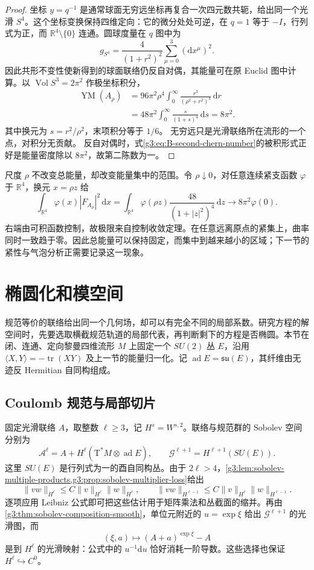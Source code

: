 \begin{proof}
	坐标 \(y=q^{-1}\) 是通常球面无穷远坐标再复合一次四元数共轭，给出同一个光滑 \(S^4\)。这个坐标变换保持四维定向：它的微分处处可逆，在 \(q=1\) 等于 \(-I\)，行列式为正，而 \(\mathbb R^4\setminus\{0\}\) 连通。圆球度量在 \(q\) 图中为
	\[
		g_{S^4}=\frac4{(1+r^2)^2}
		             \sum_{\mu=0}^3(\mathrm dx^\mu)^2.
	\]
	因此共形不变性使新得到的球面联络仍反自对偶，其能量可在原 Euclid 图中计算。以 \(\operatorname{Vol}S^3=2\pi^2\) 作极坐标积分，
	\[
	\begin{aligned}
		\operatorname{YM}(A_\rho)
		&=96\pi^2\rho^4\int_0^\infty
		             \frac{r^3}{(\rho^2+r^2)^4}\,\mathrm dr\\
		&=48\pi^2\int_0^\infty\frac{s}{(1+s)^4}\,\mathrm ds
		=8\pi^2.
	\end{aligned}
	\]
	其中换元为 \(s=r^2/\rho^2\)，末项积分等于 \(1/6\)。
	无穷远只是光滑联络所在流形的一个点，对积分无贡献。
	反自对偶时，式\eqref{g3:eq:B-second-chern-number}的被积形式正好是能量密度除以 \(8\pi^2\)，故第二陈数为一。
\end{proof}

尺度 \(\rho\) 不改变总能量，却改变能量集中的范围。令 \(\rho\downarrow0\)，对任意连续紧支函数 \(\varphi\) 于 \(\mathbb R^4\)，换元 \(x=\rho z\) 给
\[
	\int_{\mathbb R^4}\varphi(x)|F_{A_\rho}|^2\,\mathrm dx
	=\int_{\mathbb R^4}
	      \varphi(\rho z)\frac{48}{(1+|z|^2)^4}\,\mathrm dz
	\longrightarrow8\pi^2\varphi(0).
\]
右端由可积函数控制，故极限来自控制收敛定理。在任意远离原点的紧集上，曲率同时一致趋于零。因此总能量可以保持固定，而集中到越来越小的区域；下一节的紧性与气泡分析正需要记录这一现象。

\section{椭圆化和模空间}
\label{g3:sec:B02}
规范等价的联络给出同一个几何场，却可以有完全不同的局部系数。研究方程的解空间时，先要选取横截规范轨道的局部代表，再判断剩下的方程是否椭圆。本节在闭、连通、定向黎曼四维流形 \(M\) 上固定一个 \(SU(2)\) 丛 \(E\)，沿用 \(\langle X,Y\rangle=-\operatorname{tr}(XY)\) 及上一节的能量归一化。记 \(\operatorname{ad}E=\mathfrak{su}(E)\)，其纤维由无迹反 Hermitian 自同构组成。

\subsection{Coulomb 规范与局部切片}
\label{g3:subsec:B02:01}
固定光滑联络 \(A\)，取整数 \(\ell\ge3\)，记 \(H^s=W^{s,2}\)。联络与规范群的 Sobolev 空间分别为
\[
 \mathcal A^\ell=A+H^\ell(\mathrm T^*M\otimes\operatorname{ad}E),
 \qquad
 \mathcal G^{\ell+1}=H^{\ell+1}(SU(E)).
\]
这里 \(SU(E)\) 是行列式为一的酉自同构丛。由于 \(2\ell>4\)，\cref{g3:lem:sobolev-multiple-products,g3:prop:sobolev-multiplier-loss}给出
\[
 \|vw\|_{H^\ell}\le C\|v\|_{H^\ell}\|w\|_{H^\ell},\qquad
 \|vw\|_{H^{\ell-1}}\le C\|v\|_{H^\ell}\|w\|_{H^{\ell-1}}.
\]
逐项应用 Leibniz 公式即可把这些估计用于矩阵乘法和丛截面的缩并。再由\cref{g3:thm:sobolev-composition-smooth}，单位元附近的 \(u=\exp\xi\) 给出 \(\mathcal G^{\ell+1}\) 的光滑图，而
\[
 (\xi,a)\longmapsto(A+a)^{\exp\xi}-A
\]
是到 \(H^\ell\) 的光滑映射：公式中的 \(u^{-1}\mathrm du\) 恰好消耗一阶导数。这些选择也保证 \(H^\ell\hookrightarrow C^0\)。

